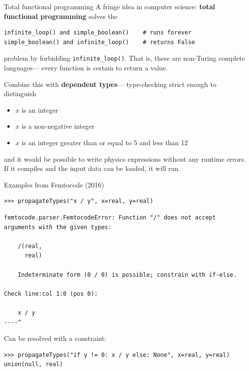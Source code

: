 \documentclass[aspectratio=169]{beamer}
\begin{document}
\begin{frame}[fragile]{Total functional programming}
\vspace{0.25 cm}
A fringe idea in computer science: {\bf total functional programming} solves the

\small
\begin{center}
\begin{minipage}{0.8\linewidth}
\begin{verbatim}
infinite_loop() and simple_boolean()    # runs forever
simple_boolean() and infinite_loop()    # returns False
\end{verbatim}
\end{minipage}
\end{center}

\normalsize
problem by forbidding \texttt{infinite_loop()}. That is, these are non-Turing complete languages--- every function is certain to return a value.

\vspace{0.5 cm}
Combine this with {\bf dependent types}--- type-checking strict enough to distinguish
\begin{itemize}
\item $x$ is an integer
\item $x$ is a non-negative integer
\item $x$ is an integer greater than or equal to 5 and less than 12
\end{itemize}

and it would be possible to write physics expressions without any runtime errors. If it compiles and the input data can be loaded, it will run.
\end{frame}

\begin{frame}[fragile]{Examples from Femtocode (2016)}
\small
\begin{verbatim}
>>> propagateTypes("x / y", x=real, y=real)
\end{verbatim}
{\color{red}
\begin{verbatim}
femtocode.parser.FemtocodeError: Function "/" does not accept
arguments with the given types:

    /(real,
      real)

    Indeterminate form (0 / 0) is possible; constrain with if-else.

Check line:col 1:0 (pos 0):

    x / y
----^
\end{verbatim}}

{\normalsize Can be resolved with a constraint:}

\begin{verbatim}
>>> propagateTypes("if y != 0: x / y else: None", x=real, y=real)
union(null, real)
\end{verbatim}
\end{frame}
\end{document}
